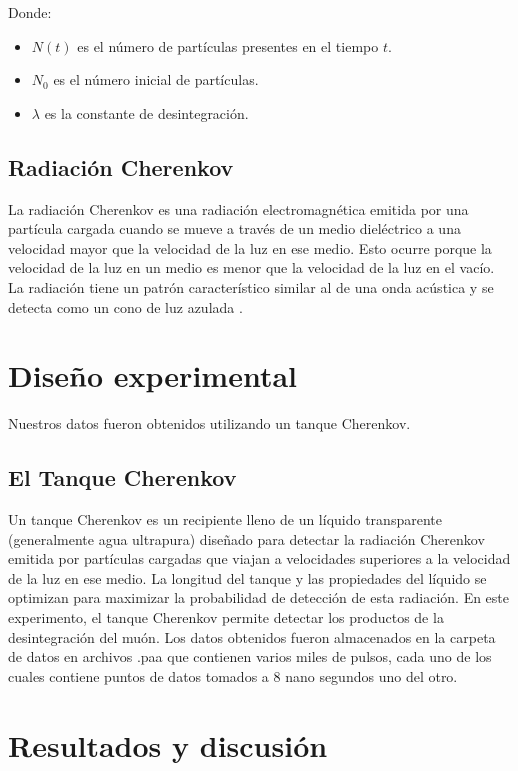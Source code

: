 \documentclass[twocolumn,a4paper,11pt]{scrartcl}
\begin{document}
Donde:
\begin{itemize}
\item   $N(t)$ es el número de partículas presentes en el tiempo $t$.
\item   $N_0$ es el número inicial de partículas.
\item   $\lambda$ es la constante de desintegración.
\end{itemize}


\subsection*{Radiación Cherenkov}
La radiación Cherenkov es una radiación electromagnética emitida por una partícula cargada cuando se mueve a través de un medio dieléctrico a una velocidad mayor que la velocidad de la luz en ese medio. Esto ocurre porque la velocidad de la luz en un medio es menor que la velocidad de la luz en el vacío. La radiación tiene un patrón característico similar al de una onda acústica y se detecta como un cono de luz azulada \cite{WikipediaCherenkov}.


\section{Diseño experimental}
Nuestros datos fueron obtenidos utilizando un tanque Cherenkov.
\subsection*{El Tanque Cherenkov}
Un tanque Cherenkov es un recipiente lleno de un líquido transparente (generalmente agua ultrapura) diseñado para detectar la radiación Cherenkov \cite{WikipediaCherenkov} emitida por partículas cargadas que viajan a velocidades superiores a la velocidad de la luz en ese medio. La longitud del tanque y las propiedades del líquido se optimizan para maximizar la probabilidad de detección de esta radiación. En este experimento, el tanque Cherenkov permite detectar los productos de la desintegración del muón. Los datos obtenidos fueron almacenados en la carpeta de datos \cite{CarpetaDatos} en archivos .paa que contienen varios miles de pulsos, cada uno de los cuales contiene puntos de datos tomados a 8 nano segundos uno del otro.

\section{Resultados y discusión}
\end{document}
